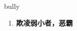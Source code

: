 
\begin{frame}
{\huge bully}
\begin{center}
\begin{enumerate}\Large
  \item \textbf{欺凌弱小者，恶霸}
\end{enumerate}
\end{center}
\end{frame}
